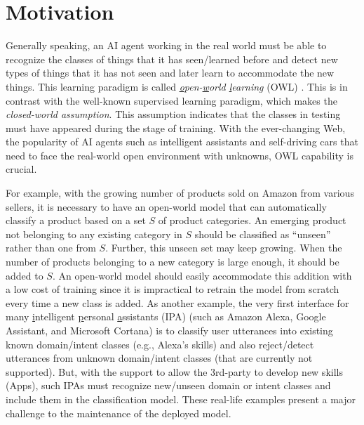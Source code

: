 \section{Motivation}
Generally speaking, an AI agent working in the real world must be able to recognize the classes of things that it has seen/learned before and detect new types of things that it has not seen and later learn to accommodate the new things. This learning paradigm is called \textit{\underline{o}pen-\underline{w}orld \underline{l}earning} (OWL)
\cite{chen2018lifelong,bendale2015towards,fei2016learning}. 
This is in contrast with the well-known supervised learning paradigm, which makes the \textit{closed-world assumption}.
This assumption indicates that the classes in testing must have appeared during the stage of training. With the ever-changing Web, the popularity of AI agents such as intelligent assistants and self-driving cars that need to face the real-world open environment with unknowns, OWL capability is crucial.

For example, with the growing number of products sold on Amazon from various sellers, it is necessary to have an open-world model that can automatically classify a product based on a set $S$ of product categories.
An emerging product not belonging to any existing category in $S$ should be classified as ``unseen'' rather than one from $S$.
Further, this unseen set may keep growing. When the number of products belonging to a new category is large enough, it should be added to $S$.
An open-world model should easily accommodate this addition with a low cost of training since it is impractical to retrain the model from scratch every time a new class is added.
As another example, the very first interface for many \underline{i}ntelligent \underline{p}ersonal \underline{a}ssistants (IPA) (such as Amazon Alexa, Google Assistant, and Microsoft Cortana) is to classify user utterances into existing known domain/intent classes (e.g., Alexa's skills) and also 
reject/detect utterances from unknown domain/intent classes (that are currently not supported).
But, with the support to allow the 3rd-party to develop new skills (Apps), such IPAs must recognize new/unseen domain or intent classes and include them in the classification model. These real-life examples present a major challenge to the maintenance of the deployed model.

